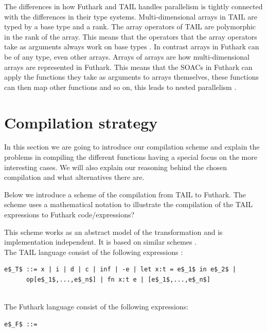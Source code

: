 \documentclass[11pt]{article}
\begin{document}
The differences in how Futhark and TAIL handles parallelism is tightly connected with the differences in their type systems.
Multi-dimensional arrays in TAIL are typed by a base type and a rank. The array operators of TAIL are polymorphic in the rank
of the array. This means that the operators that the array operators take as arguments always work on base types \cite{ElsmanDybdal:Array:2014}. In contrast
arrays in Futhark can be of any type, even other arrays. Arrays of arrays are how multi-dimensional arrays are represented in Futhark.
This means that the SOACs in Futhark can apply the functions they take as arguments to arrays themselves, these functions can then
map other functions and so on, this leads to nested parallelism \cite{TroelsHenriksen}.

\section{Compilation strategy}
In this section we are going to introduce our compilation scheme and explain the problems in compiling the different functions
having a special focus on the more interesting cases.
We will also explain our reasoning behind the chosen compilation and what alternatives there are.

Below we introduce a scheme of the compilation from TAIL to Futhark. The scheme uses a mathematical notation to illustrate
the compilation of the TAIL expressions to Futhark code/expressions?


This scheme works as an abstract model of the transformation and is implementation independent. It is based on similar schemes \cite{MartinElsmanNotation} . \\

The TAIL language consist of the following expressions \cite{ElsmanDybdal:Array:2014}: 

\begin{lstlisting}[numbers=none,frame=none]
e$_T$ ::= x | i | d | c | inf | -e | let x:t = e$_1$ in e$_2$ |
      op[e$_1$,...,e$_n$] | fn x:t e | [e$_1$,...,e$_n$]
      
\end{lstlisting}

The Futhark language consist of the following expressions\cite{TroelsHenriksen}: 
\begin{lstlisting}[numbers=none,frame=none]
e$_F$ ::= 
      
\end{lstlisting}
\end{document}
